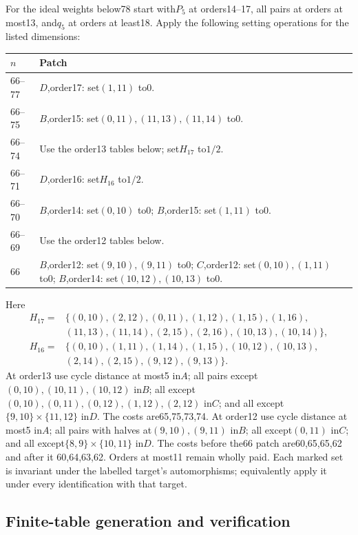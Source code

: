 \documentclass[11pt]{article}
\theoremstyle{remark}\newtheorem{remark}[theorem]{Remark}
\begin{document}
For the ideal weights below78 start with$P_5$ at orders14--17,
all pairs at orders at most13, and$q_5$ at orders at least18.
Apply the following setting operations for the listed dimensions:
\begin{center}\small
\begin{tabular}{p{}p{}}
\toprule$n$&Patch\\\midrule
66--77&$D$,order17: set$(1,11)$ to0.\\
66--75&$B$,order15: set$(0,11),(11,13),(11,14)$ to0.\\
66--74&Use the order13 tables below; set$H_{17}$ to$1/2$.\\
66--71&$D$,order16: set$H_{16}$ to$1/2$.\\
66--70&$B$,order14: set$(0,10)$ to0; $B$,order15: set$(1,11)$ to0.\\
66--69&Use the order12 tables below.\\
66&$B$,order12: set$(9,10),(9,11)$ to0; $C$,order12:
set$(0,10),(1,11)$ to0; $B$,order14: set$(10,12),(10,13)$ to0.\\
\bottomrule
\end{tabular}
\end{center}
Here
\[
\begin{split}
H_{17}={}&\{(0,10),(2,12),(0,11),(1,12),(1,15),(1,16),\\
 & (11,13),(11,14),(2,15),(2,16),(10,13),(10,14)\},\\
H_{16}={}&\{(0,10),(1,11),(1,14),(1,15),(10,12),(10,13),\\
 & (2,14),(2,15),(9,12),(9,13)\}.
\end{split}
\]
At order13 use cycle distance at most5 in$A$; all pairs except
$(0,10),(10,11),(10,12)$ in$B$; all except
$(0,10),(0,11),(0,12),(1,12),(2,12)$ in$C$; and all except
$\{9,10\}\times\{11,12\}$ in$D$. The costs are65,75,73,74.
At order12 use cycle distance at most5 in$A$; all pairs with
halves at$(9,10),(9,11)$ in$B$; all except$(0,11)$ in$C$;
and all except$\{8,9\}\times\{10,11\}$ in$D$.
The costs before the66 patch are60,65,65,62 and after it
60,64,63,62. Orders at most11 remain wholly paid.
Each marked set is invariant under the labelled target's automorphisms;
equivalently apply it under every identification with that target.

\subsection{Finite-table generation and verification}
\end{document}
